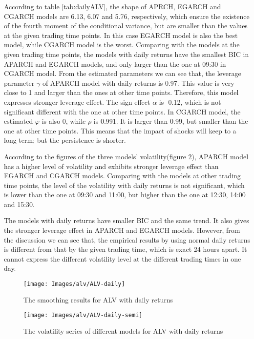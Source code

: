 According to table \ref{tab:dailyALV}, the shape of APRCH, EGARCH and CGARCH models are 6.13, 6.07 and 5.76, respectively, which ensure the existence of the fourth moment of the conditional variance, but are smaller than the values at the given trading time points. In this case EGARCH model is also the best model, while CGARCH model is the worst. Comparing with the models at the given trading time points, the models with daily returns have the smallest BIC in APARCH and EGARCH models, and only larger than the one at 09:30 in CGARCH model. From the estimated parameters we can see that, the leverage parameter $\gamma$  of APARCH model with daily returns is 0.97. This value is very close to 1 and larger than the ones at other time points. Therefore, this model expresses stronger leverage effect. The sign effect  $\alpha$  is -0.12, which is not significant different with the one at other time points. In CGARCH model, the estimated $\varphi$  is also 0, while $\rho$  is 0.991. It is larger than 0.99, but smaller than the one at other time points. This means that the impact of shocks will keep to a long term; but the persistence is shorter.

According to the figures of the three models' volatility(figure \ref{fig:ALVdailysemi}), APARCH model has a higher level of volatility and exhibits stronger leverage effect than EGARCH and CGARCH models. Comparing with the models at other trading time points, the level of the volatility with daily returns is not significant, which is lower than the one at 09:30 and 11:00, but higher than the one at 12:30, 14:00 and 15:30.

The models with daily returns have smaller BIC and the same trend. It also gives the stronger leverage effect in APARCH and EGARCH models. However, from the discussion we can see that, the empirical results by using normal daily returns is different from that by the given trading time, which is exact 24 hours apart. It cannot express the different volatility level at the different trading times in one day.

\begin{figure}[!htbp]
	\centering
	\texttt{[image: Images/alv/ALV-daily]}
	\caption[The smoothing results  for  ALV with daily returns]{The smoothing results  for  ALV with daily returns}
	\label{fig:ALVdaily}
\end{figure}


\begin{figure}[!htbp]
	\centering
	\texttt{[image: Images/alv/ALV-daily-semi]}
	\caption[The volatility series of different models for  ALV  with daily returns]{The volatility series of different models for  ALV with daily returns}
	\label{fig:ALVdailysemi}
\end{figure}




